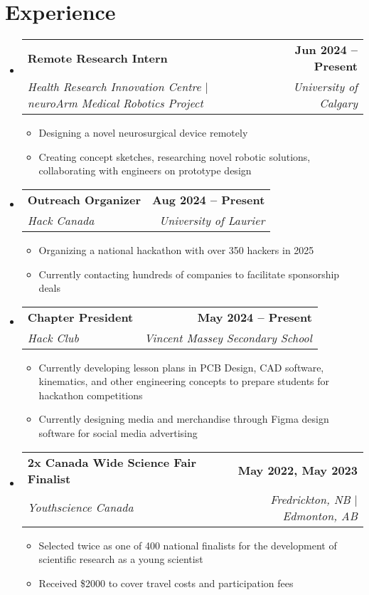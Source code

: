 \documentclass[letterpaper,11pt]{article}
\makeatletter
\newcommand{\resumeItem}[1]{
  \item\small{
    {#1 \vspace{-2pt}}
  }
}
\newcommand{\resumeSubheading}[4]{
  \vspace{-2pt}\item
    \begin{tabular*}{0.97\textwidth}[t]{l@{\extracolsep{\fill}}r}
      \textbf{#1} & #2 \\
      \textit{\small#3} & \textit{\small #4} \\
    \end{tabular*}\vspace{-7pt}
}
\newcommand{\resumeSubHeadingListStart}{\begin{itemize}[leftmargin=0.15in, label={}]}
\newcommand{\resumeSubHeadingListEnd}{\end{itemize}}
\newcommand{\resumeItemListStart}{\begin{itemize}}
\newcommand{\resumeItemListEnd}{\end{itemize}\vspace{-5pt}}
\makeatother
\begin{document}
 

\section{Experience}
  \resumeSubHeadingListStart

    \resumeSubheading
      {Remote Research Intern}{\textbf {Jun 2024 -- Present}}
      {Health Research Innovation Centre $|$ neuroArm Medical Robotics Project}{University of Calgary}
      \resumeItemListStart
        \resumeItem{Designing a novel neurosurgical device remotely}
        \resumeItem{Creating concept sketches, researching novel robotic solutions, collaborating with engineers on prototype design}
      \resumeItemListEnd

    
    \resumeSubheading
      {Outreach Organizer}{\textbf {Aug 2024 -- Present}}
      {Hack Canada}{University of Laurier}
      \resumeItemListStart
        \resumeItem{Organizing a national hackathon with over 350 hackers in 2025}
        \resumeItem{Currently contacting hundreds of companies to facilitate sponsorship deals}
      \resumeItemListEnd

    
    \resumeSubheading
      {Chapter President}{\textbf {May 2024 -- Present}}
      {Hack Club}{Vincent Massey Secondary School}
      \resumeItemListStart
        \resumeItem{Currently developing lesson plans in PCB Design, CAD software, kinematics, and other engineering concepts to prepare students for hackathon competitions}
        \resumeItem{Currently designing media and merchandise through Figma design software for social media advertising}
      \resumeItemListEnd
      

    \resumeSubheading
      {2x Canada Wide Science Fair Finalist}{\textbf {May 2022, May 2023}}
      {Youthscience Canada}{Fredrickton, NB $|$ Edmonton, AB}
      \resumeItemListStart
        \resumeItem{Selected twice as one of 400 national finalists for the development of scientific research as a young scientist}
        \resumeItem{Received \$2000 to cover travel costs and participation fees}
    \resumeItemListEnd



  \resumeSubHeadingListEnd





\end{document}
